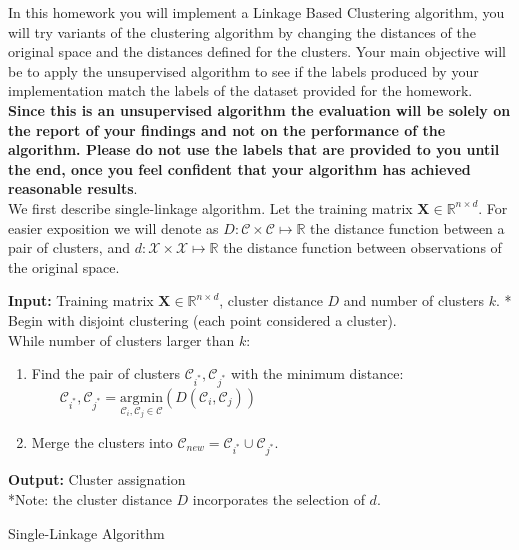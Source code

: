 \documentclass{article}
\begin{document}
In this homework you will implement a Linkage Based Clustering algorithm, you will try variants of the clustering algorithm by changing the distances of the original space and the distances defined for the clusters. Your main objective will be to apply the unsupervised algorithm to see if the  labels produced by your implementation match the  labels of the dataset provided for the homework.\\

\textbf{Since this is an unsupervised algorithm the evaluation will be solely on the report of your findings and not on the performance of the algorithm. Please do not use the  labels that are provided to you until the end, once you feel confident that your algorithm has achieved reasonable results}. \\

We first describe single-linkage algorithm. Let the training matrix $\mathbf{X}\in\mathbb{R}^{n\times d}$. For easier exposition we will denote as $D: \mathcal{C}\times\mathcal{C}\mapsto \mathbb{R}$ the distance function between a pair of clusters, and $d:\mathcal{X}\times \mathcal{X}\mapsto \mathbb{R}$ the distance function between observations of the original space.

\vspace{5mm}

\begin{algorithm}[H]
\SetAlgoLined
\textbf{Input:} Training matrix $\mathbf{X}\in\mathbb{R}^{n\times d}$, cluster distance $D$ and number of clusters $k$. * \\
Begin with disjoint clustering (each point considered a cluster). \\
While number of clusters larger than $k$:
\begin{enumerate}
\item Find the pair of clusters $\mathcal{C}_{i^*}, \mathcal{C}_{j^*}$ with the minimum distance:\\
        $\qquad \mathcal{C}_{i^*}, \mathcal{C}_{j^*} =\underset{\mathcal{C}_{i}, \mathcal{C}_{j} \in \mathcal{C}}{\text{argmin}}
        \left(D(\mathcal{C}_{i},\mathcal{C}_{j})\right)$
\item Merge the clusters into $\mathcal{C}_{new}=\mathcal{C}_{i^*}\cup \mathcal{C}_{j^*}$.
\end{enumerate}
\textbf{Output:} Cluster assignation \\
*Note: the cluster distance $D$ incorporates the selection of $d$.
\caption{Single-Linkage Algorithm}
\end{algorithm}
\end{document}
